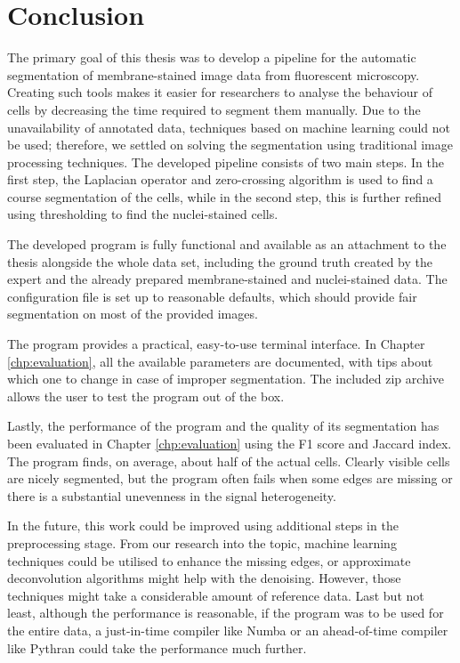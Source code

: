 \documentclass[
  digital,     %
  oneside,     %
  nosansbold,  %
  nocolorbold, %
  lof,         %
  lot,         %
]{fithesis4}
\begin{document}
\chapter{Conclusion}

The primary goal of this thesis was to develop a pipeline for the automatic segmentation of membrane-stained image data from fluorescent microscopy. Creating such tools makes it easier for researchers to analyse the behaviour of cells by decreasing the time required to segment them manually. Due to the unavailability of annotated data, techniques based on machine learning could not be used; therefore, we settled on solving the segmentation using traditional image processing techniques. The developed pipeline consists of two main steps. In the first step, the Laplacian operator and zero-crossing algorithm is used to find a course segmentation of the cells, while in the second step, this is further refined using thresholding to find the nuclei-stained cells.

The developed program is fully functional and available as an attachment to the thesis alongside the whole data set, including the ground truth
created by the expert and the already prepared membrane-stained and nuclei-stained data. The configuration file is set up to reasonable defaults, which should provide fair segmentation on most of the provided images.

The program provides a practical, easy-to-use terminal interface. In Chapter \ref{chp:evaluation}, all the available parameters are documented, with tips about which one to change in case of improper segmentation. The included zip archive allows the user to test the program out of the box.

Lastly, the performance of the program and the quality of its segmentation has been evaluated in Chapter \ref{chp:evaluation} using the F1 score and Jaccard index. The program finds, on average, about half of the actual cells. Clearly visible cells are nicely segmented, but the program often fails when some edges are missing or there is a substantial unevenness in the signal heterogeneity. 

In the future, this work could be improved using additional steps in the preprocessing stage. From our research into the topic, machine learning techniques could be utilised to enhance the missing edges, or approximate deconvolution algorithms might help with the denoising. However, those techniques might take a considerable amount of reference data. Last but not least, although the performance is reasonable, if the program was to be used for the entire data, a just-in-time compiler like Numba or an ahead-of-time compiler like Pythran could take the performance much further.
\end{document}

